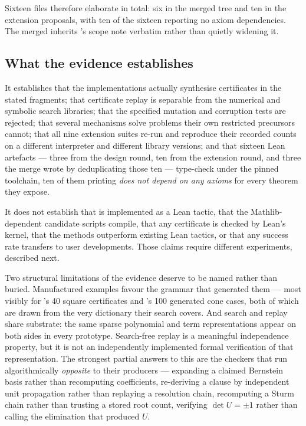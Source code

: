Sixteen files therefore elaborate in total: six in the merged tree and ten in
the extension proposals, with ten of the sixteen reporting no axiom
dependencies. The merged  inherits 's scope note
verbatim rather than quietly widening it.

\subsection{What the evidence establishes}

It establishes that the implementations actually synthesise certificates in the
stated fragments; that certificate replay is separable from the numerical and
symbolic search libraries; that the specified mutation and corruption tests are
rejected; that several mechanisms solve problems their own restricted precursors
cannot; that all nine extension suites re-run and reproduce their recorded
counts on a different interpreter and different library versions; and that
sixteen Lean artefacts --- three from the design round, ten from the extension
round, and three the merge wrote by deduplicating those ten --- type-check under
the pinned toolchain, ten of them printing \emph{does not depend on any axioms}
for every theorem they expose.

It does not establish that \forge{} is implemented as a Lean tactic, that the
Mathlib-dependent candidate scripts compile, that any certificate is checked by
Lean's kernel, that the methods outperform existing Lean tactics, or that any
success rate transfers to user developments. Those claims require different
experiments, described next.

Two structural limitations of the evidence deserve to be named rather than
buried. Manufactured examples favour the grammar that generated them --- most
visibly for 's 40 square certificates and 's 100 generated cone
cases, both of which are drawn from the very dictionary their search covers. And
search and replay share substrate: the same sparse polynomial and term
representations appear on both sides in every prototype. Search-free replay is a
meaningful independence property, but it is not an independently implemented
formal verification of that representation. The strongest partial answers to
this are the checkers that run algorithmically \emph{opposite} to their
producers --- expanding a claimed Bernstein basis rather than recomputing
coefficients, re-deriving a clause by independent unit propagation rather than
replaying a resolution chain, recomputing a Sturm chain rather than trusting a
stored root count, verifying $\det U=\pm1$ rather than calling the elimination
that produced $U$.

